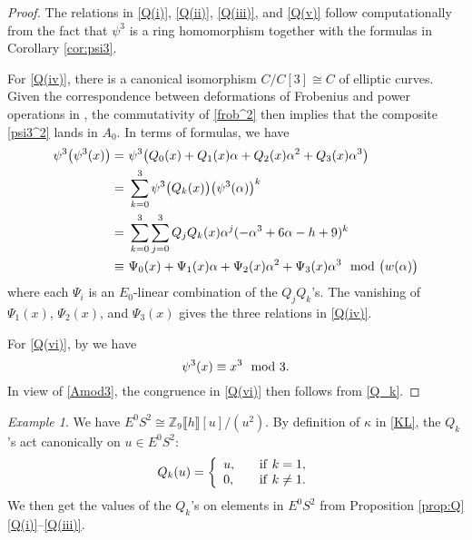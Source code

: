 \documentclass{gtpart}
\theoremstyle{definition}
\theoremstyle{remark}
\newtheorem{ex}[thm]{Example}
\newcommand{\mb}[1]{\mathbb{#1}}
\newcommand{\BZ}{{\mb Z}}
\newcommand{\md}{~~{\rm mod}~}
\newcommand{\A}{\alpha}
\newcommand{\K}{\kappa}
\newcommand{\p}{\psi^3}
\newcommand{\q}[1]{Proposition \ref{prop:Q}\thinspace \eqref{Q(#1)}}
\begin{document}
\begin{proof}
 The relations in \eqref{Q(i)}, \eqref{Q(ii)}, \eqref{Q(iii)}, and \eqref{Q(v)} follow computationally from 
 the fact that $\p$ is a ring homomorphism together with the formulas in Corollary \ref{cor:psi3}.  

 For \eqref{Q(iv)}, there is a canonical isomorphism $C/C[3] \cong C$ of elliptic curves.  
 Given the correspondence between deformations of Frobenius and power operations in \cite[Theorem B]{cong}, 
 the commutativity of \eqref{frob^2} then implies that the composite \eqref{psi3^2} lands in $A_0$.  In terms of formulas, we have 
 \begin{equation*}
 \begin{split}
  \p \big( \p(x) \big) = & ~ \p \big( Q_0(x) + Q_1(x) \A + Q_2(x) \A^2 + Q_3(x) \A^3 \big) \\
                       = & ~ \sum_{k = 0}^3 \p \big( Q_k(x) \big) \big( \p(\A) \big)^k \\
                       = & ~ \sum_{k = 0}^3 \sum_{j = 0}^3 Q_jQ_k(x) \A^j (-\A^3 + 6 \A - h + 9)^k \\
                  \equiv & ~ \Psi_0(x) + \Psi_1(x) \A + \Psi_2(x) \A^2 + \Psi_3(x) \A^3 \md \big( w(\A) \big) 
 \end{split}
 \end{equation*}
 where each $\Psi_i$ is an $E_0$-linear combination of the $Q_jQ_k$'s.  
 The vanishing of $\Psi_1(x)$, $\Psi_2(x)$, and $\Psi_3(x)$ gives the three relations in \eqref{Q(iv)}.  

 For \eqref{Q(vi)}, by \cite[Propositions 3.25 and 10.5]{cong} we have 
 \[
  \p(x) \equiv x^3 \md 3.  
 \]
 In view of \eqref{Amod3}, the congruence in \eqref{Q(vi)} then follows from \eqref{Q_k}.  
\end{proof}

\begin{ex}
\label{ex}
 We have $E^0 S^2 \cong \BZ_9 \llbracket h \rrbracket [u] / (u^2)$.  
 By definition of $\K$ in \eqref{KL}, the $Q_k$'s act canonically on $u \in E^0 S^2$: 
 \[
  Q_k(u) = \left\{
  \begin{array}{ll}
    u,  & \quad {\rm if}~k = 1, \\
    0,  & \quad {\rm if}~k \neq 1.  \\
  \end{array}
  \right.
 \]
 We then get the values of the $Q_k$'s on elements in $E^0 S^2$ from \q{i}--\eqref{Q(iii)}.  
\end{ex}
\end{document}
